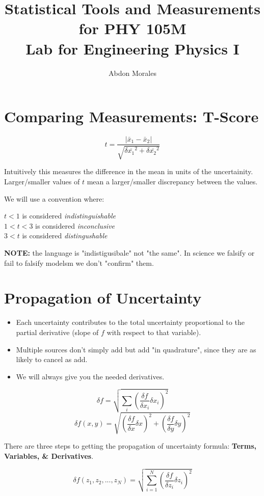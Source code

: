\documentclass[12pt,letterpaper]{article}
\author{Abdon Morales}
\title{Statistical Tools and Measurements for PHY 105M\\ Lab for Engineering Physics I}
\begin{document}
\maketitle

\section*{Comparing Measurements: T-Score}
\begin{center}
\begin{equation}
t = \frac{|\bar{x}_1-\bar{x}_2|}{\sqrt{\delta\bar{x_1}^2 + \delta\bar{x_2}^2}}
\end{equation}
\end{center}
Intuitively this measures the difference in the mean in units of the uncertainity. Larger/smaller values of $t$ mean a larger/smaller discrepancy between the values.

We will use a convention where:
\begin{center}
$t < 1$ is considered \textit{indistinguishable}\\
$1 < t < 3$ is considered \textit{inconclusive}\\
$3 < t$ is considered \textit{distingushable}\\
\end{center}
\textbf{NOTE:} the language is "indistigusibale" not "the same". In science we falsify or fail to falsify modelsm we don't "confirm" them.

\section*{Propagation of Uncertainty}
\begin{itemize}
\item Each uncertainty contributes to the total uncertainty proportional to the partial derivative (slope of $f$ with respect to that variable).
\item Multiple sources don't simply add but add "in quadrature", since they are as likely to cancel as add.
\item We will always give you the needed derivatives.
\end{itemize}
\begin{center}
\begin{equation}
\delta f = \sqrt{\sum_{i}(\frac{\delta f}{\delta x_i} \delta x_i)^2}
\end{equation}
\begin{equation}
\delta f(x,y) = \sqrt{(\frac{\delta f}{\delta x} \delta x)^2 + (\frac{\delta f}{\delta y} \delta y)^2}
\end{equation}
\end{center}
There are three steps to getting the propagation of uncertainty formula: \textbf{Terms, Variables, \& Derivatives}.
\begin{center}
\begin{equation}
\delta f(z_1, z_2, ..., z_N) = \sqrt{\sum_{i=1}^{N} (\frac{\delta f}{\delta z_i} \delta z_i)^2}
\end{equation}
\end{center}
\end{document}
